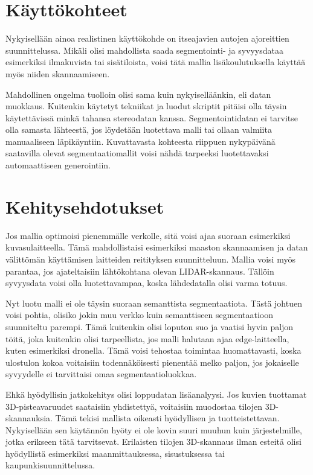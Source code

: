 \section{Käyttökohteet}

Nykyisellään ainoa realistinen käyttökohde on itseajavien autojen ajoreittien suunnittelussa.
Mikäli olisi mahdollista saada segmentointi- ja syvyysdataa esimerkiksi ilmakuvista tai sisätiloista, voisi tätä mallia lisäkoulutuksella käyttää myös niiden skannaamiseen.

Mahdollinen ongelma tuolloin olisi sama kuin nykyiselläänkin, eli datan muokkaus.
Kuitenkin käytetyt tekniikat ja luodut skriptit pitäisi olla täysin käytettävissä minkä tahansa stereodatan kanssa.
Segmentointidatan ei tarvitse olla samasta lähteestä, jos löydetään luotettava malli tai ollaan valmiita manuaaliseen läpikäyntiin.
Kuvattavasta kohteesta riippuen nykypäivänä saatavilla olevat segmentaatiomallit voisi nähdä tarpeeksi luotettavaksi automaattiseen generointiin.

\section{Kehitysehdotukset}

Jos mallia optimoisi pienemmälle verkolle, sitä voisi ajaa suoraan esimerkiksi kuvasulaitteella.
Tämä mahdollistaisi esimerkiksi maaston skannaamisen ja datan välittömän käyttämisen laitteiden reitityksen suunnitteluun.
Mallia voisi myös parantaa, jos ajateltaisiin lähtökohtana olevan LIDAR-skannaus.
Tällöin syvyysdata voisi olla luotettavampaa, koska lähdedatalla olisi varma totuus. 

Nyt luotu malli ei ole täysin suoraan semanttista segmentaatiota.
Tästä johtuen voisi pohtia, olisiko jokin muu verkko kuin semanttiseen segmentaatioon suunniteltu parempi.
Tämä kuitenkin olisi loputon suo ja vaatisi hyvin paljon töitä,
joka kuitenkin olisi tarpeellista, jos malli halutaan ajaa edge-laitteella, kuten esimerkiksi dronella. 
Tämä voisi tehostaa toimintaa huomattavasti, koska ulostulon kokoa voitaisiin todennäköisesti pienentää melko paljon, jos jokaiselle syvyydelle ei tarvittaisi omaa segmentaatioluokkaa.

Ehkä hyödyllisin jatkokehitys olisi loppudatan lisäanalyysi.
Jos kuvien tuottamat 3D-pisteavaruudet saataisiin yhdistettyä, voitaisiin muodostaa tilojen 3D-skannauksia.
Tämä tekisi mallista oikeasti hyödyllisen ja tuotteistettavan.
Nykyisellään sen käytännön hyöty ei ole kovin suuri muuhun kuin järjestelmille, jotka erikseen tätä tarvitsevat.
Erilaisten tilojen 3D-skannaus ilman esteitä olisi hyödyllistä esimerkiksi maanmittauksessa, sisustuksessa tai kaupunkisuunnittelussa.


